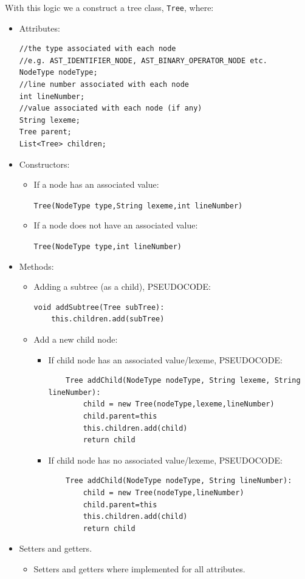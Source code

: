 With this logic we a construct a tree class, \verb!Tree!, where:
\begin{itemize}
    \item Attributes:
\begin{lstlisting}
//the type associated with each node
//e.g. AST_IDENTIFIER_NODE, AST_BINARY_OPERATOR_NODE etc.
NodeType nodeType;
//line number associated with each node
int lineNumber;
//value associated with each node (if any)
String lexeme;
Tree parent;
List<Tree> children;
\end{lstlisting}
    \item Constructors:
    \begin{itemize}
        \item If a node has an associated value:
        
        \verb!Tree(NodeType type,String lexeme,int lineNumber)!
        \item If a node does not have an associated value:
        
        \verb!Tree(NodeType type,int lineNumber)!
    \end{itemize}
    \item Methods:
    \begin{itemize}
        \item Adding a subtree (as a child), PSEUDOCODE:
\begin{lstlisting}
void addSubtree(Tree subTree):
    this.children.add(subTree)
\end{lstlisting}
    \item Add a new child node:
    \begin{itemize}
        \item If child node has an associated value/lexeme, PSEUDOCODE:
\begin{lstlisting}
    Tree addChild(NodeType nodeType, String lexeme, String lineNumber):
        child = new Tree(nodeType,lexeme,lineNumber)
        child.parent=this
        this.children.add(child)
        return child
\end{lstlisting}
        \item If child node has no associated value/lexeme, PSEUDOCODE:
\begin{lstlisting}
    Tree addChild(NodeType nodeType, String lineNumber):
        child = new Tree(nodeType,lineNumber)
        child.parent=this
        this.children.add(child)
        return child
\end{lstlisting}
    \end{itemize}
    \end{itemize}
\item Setters and getters.
\begin{itemize}
    \item Setters and getters where implemented for all attributes.
\end{itemize}

\end{itemize}

